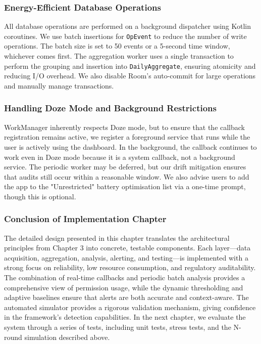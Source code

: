 \subsubsection{Energy-Efficient Database Operations}

All database operations are performed on a background dispatcher using Kotlin coroutines. We use batch insertions for \texttt{OpEvent} to reduce the number of write operations. The batch size is set to 50 events or a 5-second time window, whichever comes first. The aggregation worker uses a single transaction to perform the grouping and insertion into \texttt{DailyAggregate}, ensuring atomicity and reducing I/O overhead. We also disable Room's auto-commit for large operations and manually manage transactions.

\subsubsection{Handling Doze Mode and Background Restrictions}

WorkManager inherently respects Doze mode, but to ensure that the callback registration remains active, we register a foreground service that runs while the user is actively using the dashboard. In the background, the callback continues to work even in Doze mode because it is a system callback, not a background service. The periodic worker may be deferred, but our drift mitigation ensures that audits still occur within a reasonable window. We also advise users to add the app to the "Unrestricted" battery optimisation list via a one-time prompt, though this is optional.

\subsubsection{Conclusion of Implementation Chapter}

The detailed design presented in this chapter translates the architectural principles from Chapter 3 into concrete, testable components. Each layer—data acquisition, aggregation, analysis, alerting, and testing—is implemented with a strong focus on reliability, low resource consumption, and regulatory auditability. The combination of real-time callbacks and periodic batch analysis provides a comprehensive view of permission usage, while the dynamic thresholding and adaptive baselines ensure that alerts are both accurate and context-aware. The automated simulator provides a rigorous validation mechanism, giving confidence in the framework's detection capabilities. In the next chapter, we evaluate the system through a series of tests, including unit tests, stress tests, and the N-round simulation described above.